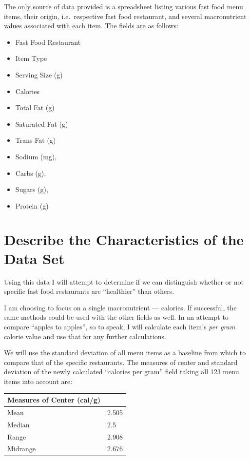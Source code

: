 \documentclass[12pt,fleqn]{article}
\newcommand{\thead}[1]{\textnormal{\textbf{#1}}}
\begin{document}
\begin{enumerate}
  The only source of data provided is a spreadsheet listing various fast food menu items, their origin, i.e.\ respective fast food restaurant, and several macronutrient values associated with each item. The fields are as follows:
  \begin{itemize}
  \item Fast Food Restaurant
  \item Item Type
  \item Serving Size (g)
  \item Calories
  \item Total Fat (g)
  \item Saturated Fat (g)
  \item Trans Fat (g)
  \item Sodium (mg),
  \item Carbs (g),
  \item Sugars (g),
  \item Protein (g)
  \end{itemize}
\end{enumerate}

\section{Describe the Characteristics of the Data Set}
Using this data I will attempt to determine if we can distinguish whether or not specific fast food restaurants are ``healthier'' than others.

I am choosing to focus on a single macronutrient --- calories. If successful, the same methods could be used with the other fields as well. In an attempt to compare ``apples to apples'', so to speak, I will calculate each item's \textit{per gram} calorie value and use that for any further calculations.

We will use the standard deviation of all menu items as a baseline from which to compare that of the specific restaurants. The measures of center and standard deviation of the newly calculated ``calories per gram'' field taking all 123 menu items into account are:

  \vspace{.25cm}
  \begin{tabular}{@{}ll@{}}
    \thead{Measures of Center (cal/g)} & \\
    \toprule
    Mean & 2.505 \\
    Median & 2.5 \\
    Range & 2.908 \\
    Midrange & 2.676 \\
  \end{tabular}
\end{document}
